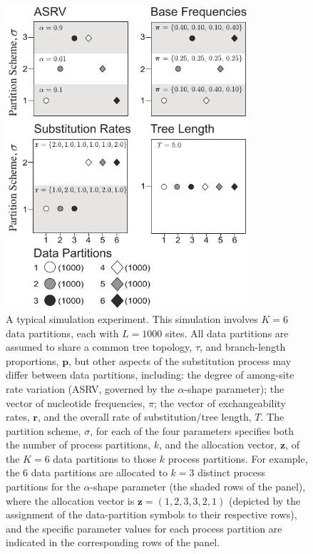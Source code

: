 \documentclass[11pt]{article}
\begin{document}
\begin{figure}[h] 
\centering 
\includegraphics[width=90mm]{figure_0.pdf} 
\caption{A typical simulation experiment.  This simulation involves $K = 6$ data partitions, each with $L = 1000$ sites. All data partitions are assumed to share a common tree topology, $\tau$, and branch-length proportions, ${\mathbf p}$, but other aspects of the substitution process may differ between data partitions, including: the degree of among-site rate variation (ASRV, governed by the $\alpha$-shape parameter); the vector of nucleotide frequencies, \mbox{\boldmath$\pi$\unboldmath}; the vector of exchangeability rates, ${\mathbf r}$, and the overall rate of substitution/tree length, $T$.  The partition scheme, $\sigma$, for each of the four parameters specifies both the number of process partitions, $k$, and the allocation vector, ${\mathbf z}$, of the $K = 6$ data partitions to those $k$ process partitions. For example, the 6 data partitions are allocated to $k = 3$ distinct process partitions for the $\alpha$-shape parameter (the shaded rows of the panel), where the allocation vector is ${\mathbf z}  = (1,2,3,3,2,1)$ (depicted by the assignment of the data-partition symbols to their respective rows), and the specific parameter values for each process partition are indicated in the corresponding rows of the panel.}
\label{sim_design}
\end{figure} 

\newpage
\end{document}
